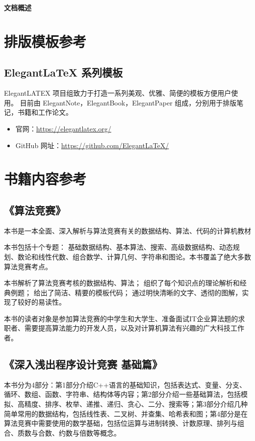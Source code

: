 \frontmatter
\thispagestyle{empty}
\begin{center}
  \textbf{\LARGE 文档概述}
\end{center}

\section*{排版模板参考}
\subsection*{Elegant\LaTeX{} 系列模板 \md{[核心版本]}}
ElegantLATEX 项目组致力于打造一系列美观、优雅、简便的模板方便用户使用。 目前由
ElegantNote，ElegantBook，ElegantPaper 组成，分别用于排版笔记，书籍和工作论文。
\begin{itemize}
  \item 官网：\href{https://elegantlatex.org/}{https://elegantlatex.org/}
  \item GitHub 网址：\href{https://github.com/ElegantLaTeX/}{https://github.com/ElegantLaTeX/}
\end{itemize}
\section*{书籍内容参考}
\subsection*{《算法竞赛》 \md{[罗勇军]}}
本书是一本全面、深入解析与算法竞赛有关的数据结构、算法、代码的计算机教材

本书包括十个专题： 基础数据结构、基本算法、搜索、高级数据结构、动态规划、数论和线性代数、组合数学、计算几何、字符串和图论。本书覆盖了绝大多数算法竞赛考点。

本书解析了算法竞赛考核的数据结构、算法； 组织了每个知识点的理论解析和经典例题； 给出了简洁、精要的模板代码； 通过明快清晰的文字、透彻的图解，实现了较好的易读性。

本书的读者对象是参加算法竞赛的中学生和大学生、准备面试IT企业算法题的求职者、需要提高算法能力的开发人员，以及对计算机算法有兴趣的广大科技工作者。
\subsection*{《深入浅出程序设计竞赛 基础篇》 \md{[汪楚奇]}}
本书分为4部分：第1部分介绍C++语言的基础知识，包括表达式、变量、分支、循环、数组、函数、字符串、结构体等内容；第2部分介绍一些基础算法，包括模拟、高精度、排序、枚举、递推、递归、贪心、二分、搜索等；第3部分介绍几种简单常用的数据结构，包括线性表、二叉树、并查集、哈希表和图；第4部分是在算法竞赛中需要使用的数学基础，包括位运算与进制转换、计数原理、排列与组合、质数与合数、约数与倍数等概念。

